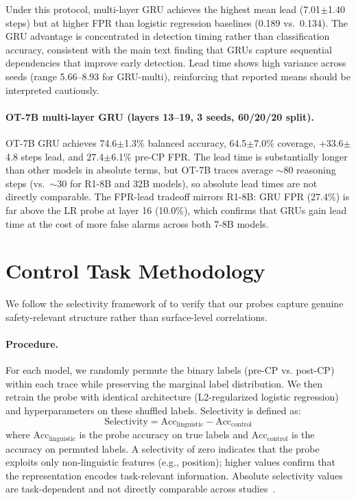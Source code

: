 Under this protocol, multi-layer GRU achieves the highest mean lead (7.01$\pm$1.40 steps) but at higher FPR than logistic regression baselines (0.189 vs.\ 0.134). The GRU advantage is concentrated in detection timing rather than classification accuracy, consistent with the main text finding that GRUs capture sequential dependencies that improve early detection. Lead time shows high variance across seeds (range 5.66--8.93 for GRU-multi), reinforcing that reported means should be interpreted cautiously.

\paragraph{OT-7B multi-layer GRU (layers 13--19, 3 seeds, 60/20/20 split).}
OT-7B GRU achieves 74.6$\pm$1.3\% balanced accuracy, 64.5$\pm$7.0\% coverage, +33.6$\pm$4.8 steps lead, and 27.4$\pm$6.1\% pre-CP FPR. The lead time is substantially longer than other models in absolute terms, but OT-7B traces average ${\sim}$80 reasoning steps (vs.\ ${\sim}$30 for R1-8B and 32B models), so absolute lead times are not directly comparable. The FPR-lead tradeoff mirrors R1-8B: GRU FPR (27.4\%) is far above the LR probe at layer 16 (10.0\%), which confirms that GRUs gain lead time at the cost of more false alarms across both 7-8B models.


\section{Control Task Methodology}
\label{app:control}

We follow the selectivity framework of \cite{hewitt2019control} to verify that our probes capture genuine safety-relevant structure rather than surface-level correlations.

\paragraph{Procedure.} For each model, we randomly permute the binary labels (pre-CP vs. post-CP) within each trace while preserving the marginal label distribution. We then retrain the probe with identical architecture (L2-regularized logistic regression) and hyperparameters on these shuffled labels. Selectivity is defined as:
\begin{equation}
    \text{Selectivity} = \text{Acc}_{\text{linguistic}} - \text{Acc}_{\text{control}}
\end{equation}
where $\text{Acc}_{\text{linguistic}}$ is the probe accuracy on true labels and $\text{Acc}_{\text{control}}$ is the accuracy on permuted labels. A selectivity of zero indicates that the probe exploits only non-linguistic features (e.g., position); higher values confirm that the representation encodes task-relevant information. Absolute selectivity values are task-dependent and not directly comparable across studies~\citep{hewitt2019control}.

